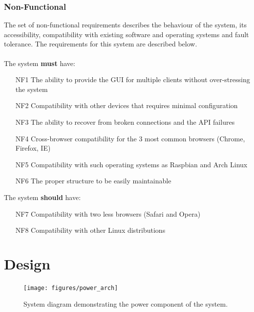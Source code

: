 \documentclass{l4proj}
\begin{document}
\subsection{Non-Functional}
\label{non-functional}
The set of non-functional requirements describes the behaviour of the system, its accessibility, compatibility with existing software and operating systems and fault tolerance. The requirements for this system are described below.\\\\
The system \textbf{must} have:
\begin{enumerate}
\item [NF1] The ability to provide the GUI for multiple clients without over-stressing the system
\item [NF2] Compatibility with other devices that requires minimal configuration
\item [NF3] The ability to recover from broken connections and the API failures
\item [NF4] Cross-browser compatibility for the 3 most common browsers (Chrome, Firefox, IE)
\item [NF5] Compatibility with such operating systems as Raspbian and Arch Linux
\item [NF6] The proper structure to be easily maintainable
\end{enumerate}
The system \textbf{should} have:
\begin{enumerate}
\item [NF7] Compatibility with two less browsers (Safari and Opera)
\item [NF8] Compatibility with other Linux distributions
\end{enumerate}
\chapter{Design}
\label{chap_design}
\begin{figure}[!ht]
  \caption{System diagram demonstrating the power component of the system.}
  \centering
    \texttt{[image: figures/power\_arch]}
\end{figure}
\end{document}
